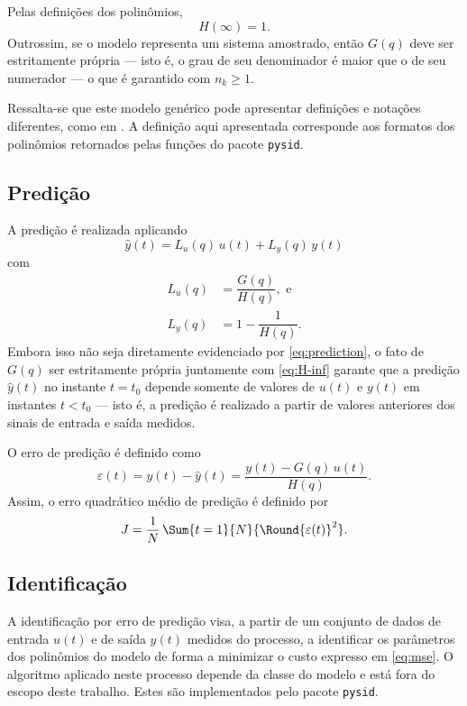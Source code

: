 \documentclass{ppgeesa}
\renewcommand{\Prod}{\,}
\begin{document}
Pelas definições dos polinômios,
\begin{equation}\label{eq:H-inf}
  H(\infty) = 1
  .
\end{equation}
Outrossim, se o modelo representa um sistema amostrado, então $G(q)$ deve ser estritamente própria --- isto é, o grau de seu denominador é maior que o de seu numerador --- o que é garantido com $n_k \geq 1$.

Ressalta-se que este modelo genérico pode apresentar definições e notações diferentes, como em \cite{book:Ljung1999, book:Aguirre2007, misc:matlab-polynomial-models}.
A definição aqui apresentada corresponde aos formatos dos polinômios retornados pelas funções do pacote \texttt{pysid}.

\subsection{Predição}

A predição é realizada aplicando
\begin{equation}\label{eq:prediction}
  \hat{y}(t) = L_u(q) \Prod u(t) + L_y(q) \Prod y(t)
\end{equation}
com
\begin{align}
  L_u(q) &= \dfrac{G(q)}{H(q)}
  , \text{ e}
  \\
  L_y(q) &= 1 - \dfrac{1}{H(q)}
  .
\end{align}
Embora isso não seja diretamente evidenciado por \eqref{eq:prediction}, o fato de $G(q)$ ser estritamente própria juntamente com \eqref{eq:H-inf} garante que a predição $\hat{y}(t)$ no instante $t = t_0$ depende somente de valores de $u(t)$ e $y(t)$ em instantes $t < t_0$ --- isto é, a predição é realizado a partir de valores anteriores dos sinais de entrada e saída medidos.

O erro de predição é definido como
\begin{equation}
  \varepsilon(t)
  = y(t) - \hat{y}(t)
  = \dfrac{y(t) - G(q) \Prod u(t)}{H(q)}
  .
\end{equation}
Assim, o erro quadrático médio de predição é definido por
\begin{equation}\label{eq:mse}
  J = \dfrac{1}{N} \Prod \Sum{t=1}{N}{\Round{\varepsilon(t)}^2}
  .
\end{equation}

\subsection{Identificação}
A identificação por erro de predição visa, a partir de um conjunto de dados de entrada $u(t)$ e de saída $y(t)$ medidos do processo, a identificar os parâmetros dos polinômios do modelo de forma a minimizar o custo expresso em \eqref{eq:mse}.
O algoritmo aplicado neste processo depende da classe do modelo e está fora do escopo deste trabalho.
Estes são implementados pelo pacote \texttt{pysid}.
\end{document}

